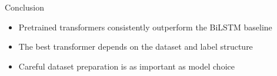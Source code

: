\documentclass[aspectratio=169]{beamer}
\begin{document}
\begin{frame}{Conclusion}
\begin{itemize}\setlength\itemsep{0.5cm}
    \item Pretrained transformers consistently outperform the BiLSTM baseline
    \item The best transformer depends on the dataset and label structure
    \item Careful dataset preparation is as important as model choice
\end{itemize}
\end{frame}
\end{document}

